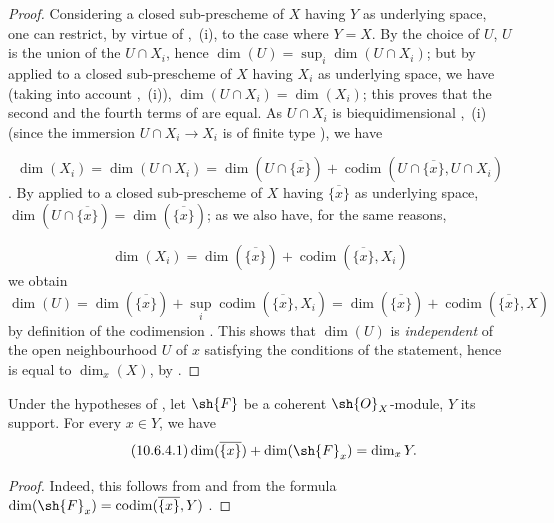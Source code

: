 \begin{proof}
Considering a closed sub-prescheme of $X$ having $Y$ as underlying space, one can restrict, by virtue of ,~(i), to the case where $Y=X$.
By the choice of $U$, $U$ is the union of the $U\cap X_i$, hence $\dim(U)=\sup_i\dim(U\cap X_i)$; but by  applied to a closed sub-prescheme of $X$ having $X_i$ as underlying space, we have (taking into account ,~(i)), $\dim(U\cap X_i)=\dim(X_i)$; this proves that the second and the fourth terms of  are equal.
As $U\cap X_i$ is biequidimensional ,~(i) (since the immersion $U\cap X_i\to X_i$ is of finite type ), we have

\begin{equation}
\label{IV.10.6.3.2}
\tag{10.6.3.2}
\dim(X_i)=\dim(U\cap X_i)=\dim(U\cap\overline{\{x\}})+\operatorname{codim}(U\cap\overline{\{x\}},U\cap X_i)
\end{equation}
.
By  applied to a closed sub-prescheme of $X$ having $\overline{\{x\}}$ as underlying space, $\dim(U\cap\overline{\{x\}})=\dim(\overline{\{x\}})$; as we also have, for the same reasons,

\begin{equation}
\label{IV.10.6.3.3}
\tag{10.6.3.3}
\dim(X_i)=\dim(\overline{\{x\}})+\operatorname{codim}(\overline{\{x\}},X_i)
\end{equation}
we obtain
\[
  \dim(U)=\dim(\overline{\{x\}})+\sup_i\operatorname{codim}(\overline{\{x\}},X_i)=\dim(\overline{\{x\}})+\operatorname{codim}(\overline{\{x\}},X)
\]
by definition of the codimension .
This shows that $\dim(U)$ is \emph{independent} of the open neighbourhood $U$ of $x$ satisfying the conditions of the statement, hence is equal to $\dim_x(X)$, by .
\end{proof}

\begin{corollary}[10.6.4]
\label{IV.10.6.4}
Under the hypotheses of , let $\sh{F}$ be a coherent $\sh{O}_X$-module, $Y$ its support.
For every $x\in Y$, we have
\begin{equation}
\label{IV.10.6.4.1}
\tag{10.6.4.1}
\dim(\overline{\{x\}})+\dim(\sh{F}_x)=\dim_x Y.
\end{equation}
\end{corollary}

\begin{proof}
Indeed, this follows from  and from the formula $\dim(\sh{F}_x)=\operatorname{codim}(\overline{\{x\}},Y)$ .
\end{proof}

